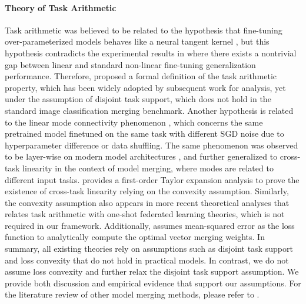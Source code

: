 \paragraph{Theory of Task Arithmetic}
Task arithmetic was believed to be related to the hypothesis that fine-tuning over-parameterized models behaves like a neural tangent kernel \citep{jacot2018neural}, but this hypothesis contradicts the experimental results in \citet{ortiz2024task} where there exists a nontrivial gap between linear and standard non-linear fine-tuning generalization performance. Therefore, \citet{ortiz2024task} proposed a formal definition of the task arithmetic property, which has been widely adopted by subsequent work \citep{xiong2024multi} for analysis, yet under the assumption of disjoint task support, which does not hold in the standard image classification merging benchmark. Another hypothesis is related to the linear mode connectivity \citep{garipov2018loss} phenomenon \citep{frankle2020linear, neyshabur2020being}, which concerns the same pretrained model finetuned on the same task with different SGD noise due to hyperparameter difference or data shuffling. The same phenomenon was observed to be layer-wise on modern model architectures \citep{adilova2023layerwise}, and further generalized to cross-task linearity \citep{zhou2024cross} in the context of model merging, where modes are related to different input tasks. \citet{zhou2024cross} provides a first-order Taylor expansion analysis to prove the existence of cross-task linearity relying on the convexity assumption. Similarly, the convexity assumption also appears in more recent theoretical analyses \citep{tao2024task} that relates task arithmetic with one-shot federated learning theories, which is not required in our framework. Additionally, \citet{zhou2024metagpt} assumes mean-squared error as the loss function to analytically compute the optimal vector merging weights. In summary, all existing theories rely on assumptions such as disjoint task support and loss convexity that do not hold in practical models. In contrast, we do not assume loss convexity and further relax the disjoint task support assumption. We provide both discussion and empirical evidence that support our assumptions. For the literature review of other model merging methods, please refer to .

